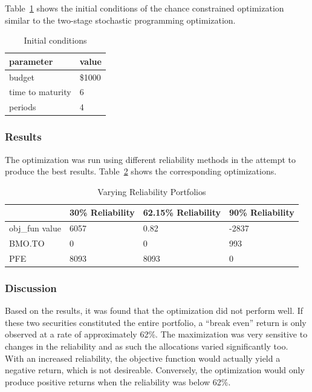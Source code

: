 \documentclass[12pt]{article}
\begin{document}
Table~\ref{tab:init_cond2} shows the initial conditions of the chance constrained optimization similar to the two-stage stochastic programming optimization.

\begin{table}[H]
	\centering
\begin{tabular}{|l|l|}
\hline
	\textbf{parameter} & \textbf{value} \\ \hline
	budget & \$1000 \\ \hline
	time to maturity & 6\\ \hline
	periods & 4 \\ \hline
\end{tabular}
\caption {Initial conditions}
\label{tab:init_cond2}
\end{table}

\subsubsection{Results}
The optimization was run using different reliability methods in the attempt to produce the best results. Table~\ref{tab:result_cc} shows the corresponding optimizations. 

\begin{table}[H]
\centering
\begin{tabular}{|l|l|l|l|}
\hline
	~ & \textbf{30\% Reliability} & \textbf{62.15\% Reliability} & \textbf{90\% Reliability} \\ \hline
	obj\_fun value & 6057 & 0.82 & -2837 \\ \hline
	BMO.TO & 0 & 0 & 993 \\ \hline
	PFE & 8093 & 8093 & 0\\ \hline
\end{tabular}
\caption {Varying Reliability Portfolios}
\label{tab:result_cc}
\end{table}

\subsubsection{Discussion} %
Based on the results, it was found that the optimization did not perform well. If these two securities constituted the entire portfolio, a ``break even'' return is only observed at a rate of approximately 62\%. The maximization was very sensitive to changes in the reliability and as such the allocations varied significantly too. With an increased reliability, the objective function would actually yield a negative return, which is not desireable. Conversely, the optimization would only produce positive returns when the reliability was below 62\%. 
\end{document}
